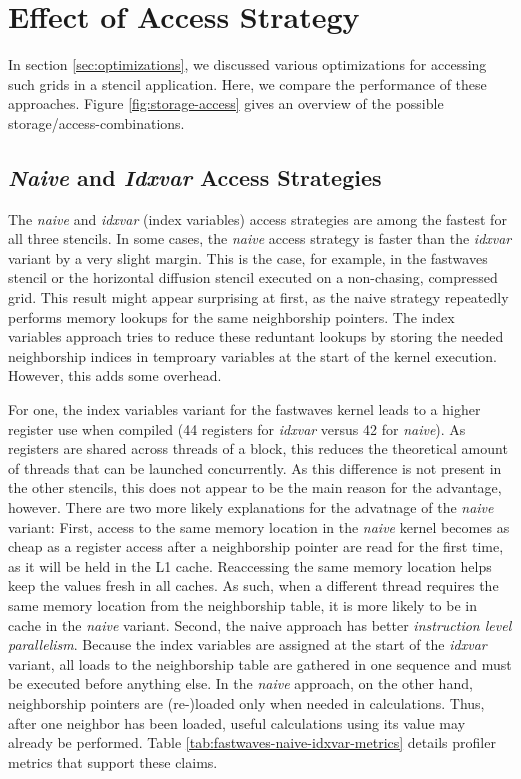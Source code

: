 \section{Effect of Access Strategy} \label{sec:res-access}

In section \ref{sec:optimizations}, we discussed various optimizations for accessing such grids in a stencil application. Here, we compare the performance of these approaches. Figure \ref{fig:storage-access} gives an overview of the possible storage/access-combinations.


\subsection{\emph{Naive} and \emph{Idxvar} Access Strategies}
The \emph{naive} and \emph{idxvar} (index variables) access strategies are among the fastest for all three stencils. In some cases, the \emph{naive} access strategy is faster than the \emph{idxvar} variant by a very slight margin. This is the case, for example, in the fastwaves stencil or the horizontal diffusion stencil executed on a non-chasing, compressed grid. This result might appear surprising at first, as the naive strategy repeatedly performs memory lookups for the same neighborship pointers. The index variables approach tries to reduce these reduntant lookups by storing the needed neighborship indices in temproary variables at the start of the kernel execution. However, this adds some overhead.

For one, the index variables variant for the fastwaves kernel leads to a higher register use when compiled (44 registers for \emph{idxvar} versus 42 for \emph{naive}). As registers are shared across threads of a block, this reduces the theoretical amount of threads that can be launched concurrently. As this difference is not present in the other stencils, this does not appear to be the main reason for the advantage, however. There are two more likely explanations for the advatnage of the \emph{naive} variant: First, access to the same memory location in the \emph{naive} kernel becomes as cheap as a register access after a neighborship pointer are read for the first time, as it will be held in the L1 cache. Reaccessing the same memory location helps keep the values fresh in all caches. As such, when a different thread requires the same memory location from the neighborship table, it is more likely to be in cache in the \emph{naive} variant. Second, the naive approach has better \emph{instruction level parallelism}. Because the index variables are assigned at the start of the \emph{idxvar} variant, all loads to the neighborship table are gathered in one sequence and must be executed before anything else. In the \emph{naive} approach, on the other hand, neighborship pointers are (re-)loaded only when needed in calculations. Thus, after one neighbor has been loaded, useful calculations using its value may already be performed. Table \ref{tab:fastwaves-naive-idxvar-metrics} details profiler metrics that support these claims.

